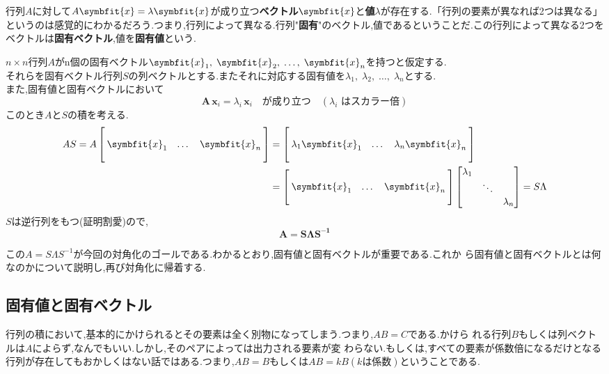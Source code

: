 行列$A$に対して$A\symbfit{x}=\lambda\symbfit{x}$が成り立つ\textbf{ベクトル}$\symbfit{x}$と\textbf{値}$\lambda$が存在する.「行列の要素が異なれば2つは異なる」というのは感覚的にわかるだろう.つまり,行列によって異なる.行列"\textbf{固有}"のベクトル,値であるということだ.この行列によって異なる2つをベクトルは\textbf{固有ベクトル},値を\textbf{固有値}という.
\begin{tcolorbox}[colframe=black!80,colback=white,title=対角化の導出]
    $n\times n$行列$A$がn個の固有ベクトル$\symbfit{x}_1,\;\symbfit{x}_2,\;\dots,\;\symbfit{x}_n$を持つと仮定する.\\
    それらを固有ベクトル行列$S$の列ベクトルとする.またそれに対応する固有値を$\lambda_1,\;\lambda_2,\;\dots,\;\lambda_n$とする.\\
    また,固有値と固有ベクトルにおいて
    \[\mathbf{A}\,\mathbf{x}_i = \lambda_i\,\mathbf{x}_i\quad\text{が成り立つ}\quad(\lambda_i\text{ はスカラー倍})\]
    このとき$A$と$S$の積を考える.
    \begin{align*}
        AS = A
        \begin{bmatrix}
            && \\ \:\symbfit{x}_1 & \dots &  \symbfit{x}_n\: \\ &&
        \end{bmatrix}
        &=
                \begin{bmatrix}
            && \\ \:\lambda_1\symbfit{x}_1 & \dots &  \lambda_n\symbfit{x}_n\: \\ &&
        \end{bmatrix} \\
        &=\begin{bmatrix}
            && \\ \:\symbfit{x}_1 & \dots &  \symbfit{x}_n\: \\ &&
        \end{bmatrix}
        \begin{bmatrix}
            \lambda_1 & & \\ & \ddots & \\ && \lambda_n
        \end{bmatrix}=S\Lambda
    \end{align*}
    $S$は逆行列をもつ(証明割愛)ので,
    \[
    \mathbf{A=SΛS^{-1}}
    \]
\end{tcolorbox}
この$A = S\Lambda S^{-1}$が今回の対角化のゴールである.わかるとおり,固有値と固有ベクトルが重要である.これか
ら固有値と固有ベクトルとは何なのかについて説明し,再び対角化に帰着する.
\subsection{固有値と固有ベクトル}
行列の積において,基本的にかけられるとその要素は全く別物になってしまう.つまり,$AB=C$である.かけら
れる行列$B$もしくは列ベクトルは$A$によらず,なんでもいい.しかし,そのペアによっては出力される要素が変
わらない.もしくは,すべての要素が係数倍になるだけとなる行列が存在してもおかしくはない話ではある.つまり,$AB=B$もしくは$AB=kB(k\text{は係数})$ということである.

